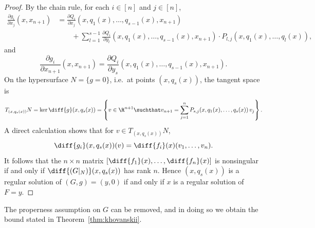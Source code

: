 \begin{proof}
By the chain rule, for each $i \in [n]$ and $j \in [n]$,
\begin{align*}
  \frac{\partial g_i}{\partial x_j}(x, x_{n+1}) &= \frac{\partial Q_i}{\partial x_j}(x, q_1(x), \ldots, q_{s-1}(x), x_{n+1}) \\
  &\qquad + \sum_{l=1}^{s-1} \frac{\partial Q_i}{\partial y_l}(x, q_1(x), \ldots, q_{s-1}(x), x_{n+1})\cdot P_{l,j}(x, q_1(x), \ldots, q_l(x)),
\end{align*}
and
\begin{equation*}
  \frac{\partial g_i}{\partial x_{n+1}}(x, x_{n+1}) = \frac{\partial Q_i}{\partial y_s}(x, q_1(x), \ldots, q_{s-1}(x), x_{n+1}).
\end{equation*}
On the hypersurface $N = \{g = 0\}$, i.e.\ at points $(x, q_s(x))$, the tangent space is
\begin{equation*}
  T_{(x, q_s(x))} N = \ker \diff{g}(x, q_s(x)) = \left\{v \in \R^{n+1} \suchthat v_{n+1} = \sum_{j=1}^n P_{s,j}(x, q_1(x), \ldots, q_s(x))\, v_j\right\}.
\end{equation*}
A direct calculation shows that for $v \in T_{(x, q_s(x))} N$,
\begin{equation*}
  \diff{g_i}(x, q_s(x))(v) = \diff{f_i}(x)(v_1, \ldots, v_n).
\end{equation*}
It follows that the $n \times n$ matrix $[\diff{f_1}(x), \ldots, \diff{f_n}(x)]$ is nonsingular if and only if $\diff{(G|_N)}(x, q_s(x))$ has rank $n$. Hence $(x, q_s(x))$ is a regular solution of $(G, g) = (y, 0)$ if and only if $x$ is a regular solution of $F = y$.
\end{proof}

\begin{claim} \label{claim:G-proper}
  The properness assumption on $G$ can be removed, and in doing so we obtain the bound stated in Theorem~\ref{thm:khovanskii}.
\end{claim}


